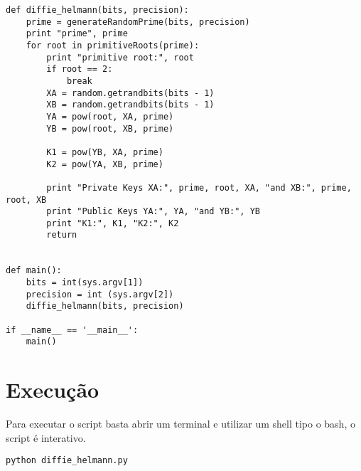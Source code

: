 \documentclass[a4paper,11pt]{article}
\theoremstyle{mytheor}
\begin{document}
\begin{lstlisting}[caption=Diffie Helmann utilizando Miller Rabin em Python.]
def diffie_helmann(bits, precision):
    prime = generateRandomPrime(bits, precision)
    print "prime", prime
    for root in primitiveRoots(prime):
        print "primitive root:", root
        if root == 2:
            break
        XA = random.getrandbits(bits - 1)
        XB = random.getrandbits(bits - 1)
        YA = pow(root, XA, prime)
        YB = pow(root, XB, prime)

        K1 = pow(YB, XA, prime)
        K2 = pow(YA, XB, prime)

        print "Private Keys XA:", prime, root, XA, "and XB:", prime, root, XB
        print "Public Keys YA:", YA, "and YB:", YB
        print "K1:", K1, "K2:", K2
        return


def main():
    bits = int(sys.argv[1])
    precision = int (sys.argv[2])
    diffie_helmann(bits, precision)

if __name__ == '__main__':
    main()

\end{lstlisting}

\section*{Execução}

Para executar o script basta abrir um terminal e utilizar um shell tipo o bash, o script é interativo.

\begin{lstlisting}[label={list:second},caption=Executando o script.]
python diffie_helmann.py
\end{lstlisting}
\end{document}
